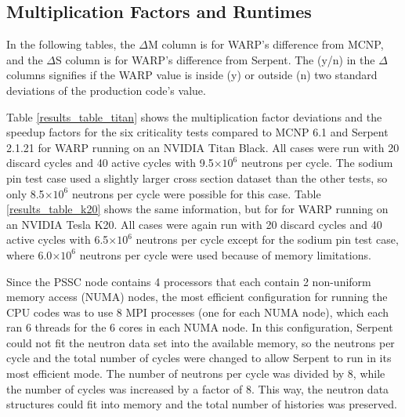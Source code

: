 \documentclass[preprint,12pt]{elsarticle}
\begin{document}
\subsection{Multiplication Factors and Runtimes}

In the following tables, the $\Delta$M column is for WARP's difference from MCNP, and the $\Delta$S column is for WARP's difference from Serpent.  The (y/n) in the $\Delta$ columns signifies if the WARP value is inside (y) or outside (n) two standard deviations of the production code's value. 

Table \ref{results_table_titan} shows the multiplication factor deviations and the speedup factors for the six criticality tests compared to MCNP 6.1 and Serpent 2.1.21 for WARP running on an NVIDIA Titan Black.   All cases were run with 20 discard cycles and 40 active cycles with 9.5$\times10^{6}$ neutrons per cycle.  The sodium pin test case used a slightly larger cross section dataset than the other tests, so only 8.5$\times10^{6}$ neutrons per cycle were possible for this case.  Table  \ref{results_table_k20} shows the same information, but for for WARP running on an NVIDIA Tesla K20.  All cases were again run with 20 discard cycles and 40 active cycles with 6.5$\times10^{6}$ neutrons per cycle except for the sodium pin test case, where 6.0$\times10^{6}$ neutrons per cycle were used because of memory limitations.

Since the PSSC node contains 4 processors that each contain 2 non-uniform memory access (NUMA) nodes, the most efficient configuration for running the CPU codes was to use 8 MPI processes (one for each NUMA node), which each ran 6 threads for the 6 cores in each NUMA node.  In this configuration, Serpent could not fit the neutron data set into the available memory, so the neutrons per cycle and the total number of cycles were changed to allow Serpent to run in its most efficient mode.  The number of neutrons per cycle was divided by 8, while the number of cycles was increased by a factor of 8.  This way, the neutron data structures could fit into memory and the total number of histories was preserved.
\end{document}
